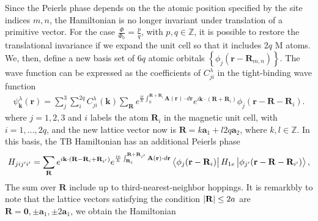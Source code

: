 \documentclass{article}
\begin{document}
Since the Peierls phase depends on the the atomic position specified by the site indices $m,n$, the Hamiltonian is no longer invariant under translation of a primitive vector. For the case $\frac{\Phi}{\Phi_{0}} = \frac{p}{q}$, with $p,q \in \mathbb{Z}$, it is possible to restore the translational invariance if we expand the unit cell so that it includes $2q$ M atoms. We, then, define a new basis set of $6q$ atomic orbitals $\left\{ \phi_{j}(\mathbf{r} - \mathbf{R}_{m,n}) \right\}$. The wave function can be expressed as the coefficients of $C_{ji}^{\lambda}$ in the tight-binding wave function
\begin{gather}
	\psi_{\mathbf{k}}^{\lambda}(\mathbf{r}) = \sum_{j}^{3}\sum_{i}^{2q} C_{ji}^{\lambda}(\mathbf{k}) \sum_{{\mathbf{R}}} e^{\frac{ie}{\hbar}\int_0^{\mathbf{R} + \mathbf{R}_{i}}\mathbf{A}(\mathbf{r})\cdot d\mathbf{r}} e^{i\mathbf{k} \cdot (\mathbf{R} + \mathbf{R}_{i}) } \phi_{j}(\mathbf{r} - \mathbf{R} - \mathbf{R}_{i}).
\end{gather}
where $j = 1,2,3$ and $i$ labels the atom $\mathbf{R}_{i}$ in the magnetic unit cell, with $i = 1, \ldots, 2q$, and the new lattice vector now is $\mathbf{R} = k \mathbf{a}_{1} + l 2q \mathbf{a}_{2}$, where $k,l \in \mathbb{Z}$. In this basis, the TB Hamiltonian has an additional Peierls phase
\begin{gather}
	H_{j i  j' i'} = \sum_{\mathbf{R}} e^{i \mathbf{k} \cdot ( \mathbf{R} - \mathbf{R}_{i} + \mathbf{R}_{i'} )} e^{\frac{ie}{\hbar} \int_{\mathbf{R}_{i}}^{\mathbf{R} + \mathbf{R}_{i'}} \mathbf{A}(\mathbf{r}) \cdot d \mathbf{r}} \bra{\phi_{j}(\mathbf{r} - \mathbf{R}_{i})} H_{1e} \ket{\phi_{j'}(\mathbf{r} - \mathbf{R} - \mathbf{R}_{i'})},
\end{gather}
The sum over $\mathbf{R}$ include up to third-nearest-neighbor hoppings. It is remarkbly to note that the lattice vectors satisfying the condition $\abs{\mathbf{R}} \leq 2a$ are $\mathbf{R} = \mathbf{0}, \pm \mathbf{a}_{1}, \pm 2 \mathbf{a}_{1}$, we obtain the Hamiltonian
\end{document}
